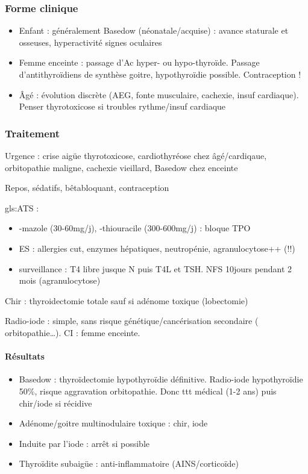 \documentclass[11pt]{article}
\begin{document}
\subsubsection{Forme clinique}
\label{sec:orge4b050b}
\begin{itemize}
\item Enfant : généralement Basedow (néonatale/acquise) : avance staturale et
osseuses, hyperactivité \textpm{} signes oculaires
\item Femme enceinte : passage d'Ac \thus hyper- ou hypo-thyroïde. Passage
d'antithyroïdiens de synthèse \thus goitre, hypothyroïdie possible. Contraception !
\item Âgé : évolution discrète (AEG, fonte musculaire, cachexie, insuf
cardiaque). Penser thyrotoxicose si troubles rythme/insuf cardiaque
\end{itemize}

\subsubsection{Traitement}
\label{sec:org15eefdd}
\faBomb{} Urgence : crise aigüe thyrotoxicose, cardiothyréose chez âgé/cardiqaue,
orbitopathie maligne, cachexie vieillard, Basedow chez \female{} enceinte

Repos, sédatifs, bêtabloquant, contraception

gls:ATS :
\begin{itemize}
\item -mazole (30-60mg/j), -thiouracile (300-600mg/j) : bloque TPO
\item ES : allergies cut, \inc enzymes hépatiques, neutropénie, agranulocytose++
(\faBomb !!)
\item surveillance : T4 libre jusque N puis T4L et TSH. NFS 10jours pendant 2 mois (agranulocytose)
\end{itemize}

Chir : thyroidectomie totale sauf si adénome toxique (lobectomie)

Radio-iode : simple, sans risque génétique/cancérisation secondaire (\danger{} orbitopathie\ldots{}). CI : femme enceinte.

\paragraph{Résultats}
\label{sec:org733dd95}
\begin{itemize}
\item Basedow : thyroïdectomie \thus hypothyroïdie définitive. Radio-iode \thus
hypothyroïdie 50\%, risque aggravation orbitopathie. Donc ttt médical (1-2
ans) puis chir/iode si récidive
\item Adénome/goitre multinodulaire toxique : chir, iode
\item Induite par l'iode : arrêt si possible
\item Thyroïdite subaigüe : anti-inflammatoire (AINS/corticoïde)
\end{itemize}
\end{document}
